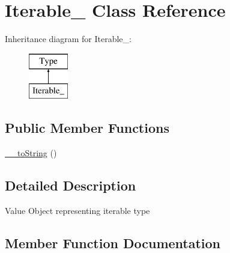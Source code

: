 \hypertarget{classphp_documentor_1_1_reflection_1_1_types_1_1_iterable__}{}\section{Iterable\+\_\+ Class Reference}
\label{classphp_documentor_1_1_reflection_1_1_types_1_1_iterable__}
Inheritance diagram for Iterable\+\_\+\+:\begin{figure}[H]
\begin{center}
\leavevmode
\includegraphics[height=2.000000cm]{classphp_documentor_1_1_reflection_1_1_types_1_1_iterable__}
\end{center}
\end{figure}
\subsection*{Public Member Functions}
\begin{DoxyCompactItemize}
\item 
\mbox{\hyperlink{classphp_documentor_1_1_reflection_1_1_types_1_1_iterable___a7516ca30af0db3cdbf9a7739b48ce91d}{\+\_\+\+\_\+to\+String}} ()
\end{DoxyCompactItemize}


\subsection{Detailed Description}
Value Object representing iterable type 

\subsection{Member Function Documentation}
\mbox{\label{classphp_documentor_1_1_reflection_1_1_types_1_1_iterable___a7516ca30af0db3cdbf9a7739b48ce91d}} 
